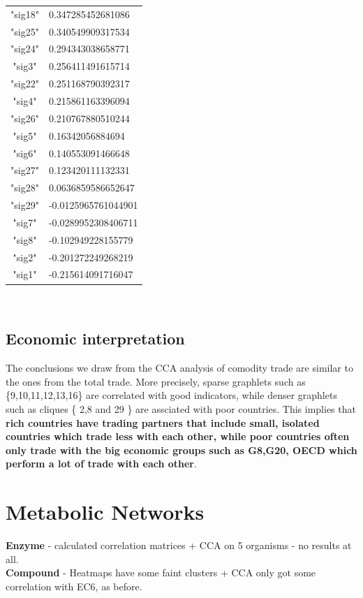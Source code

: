 \documentclass[11pt,a4paper,oneside]{report}
\begin{document}
\begin{tabular}{ c | l }
"sig18"& 0.347285452681086\\
"sig25"& 0.340549909317534\\
"sig24"& 0.294343038658771\\
"sig3"& 0.256411491615714\\
"sig22"& 0.251168790392317\\
"sig4"& 0.215861163396094\\
"sig26"& 0.210767880510244\\
"sig5"& 0.16342056884694\\
"sig6"& 0.140553091466648\\
"sig27"& 0.123420111132331\\
"sig28"& 0.0636859586652647\\
"sig29"& -0.0125965761044901\\
"sig7"& -0.0289952308406711\\
"sig8"& -0.102949228155779\\
"sig2"& -0.201272249268219\\
"sig1"& -0.215614091716047\\
\end{tabular}\\

\subsection*{Economic interpretation}

The conclusions we draw from the CCA analysis of comodity trade are similar to the ones from the total trade. More precisely, sparse graphlets such as \{9,10,11,12,13,16\} are correlated with good indicators, while denser graphlets such as cliques \{ 2,8 and 29 \} are assciated with poor countries. This implies that \textbf{rich countries have trading partners that include small, isolated countries which trade less with each other, while poor countries often only trade with the big economic groups such as G8,G20, OECD which perform a lot of trade with each other}.

\section*{Metabolic Networks}

\textbf{Enzyme} - calculated correlation matrices + CCA on 5 organisms - no results at all.\\
\textbf{Compound} - Heatmaps have some faint clusters + CCA only got some correlation with EC6, as before.\\ 
\end{document}
